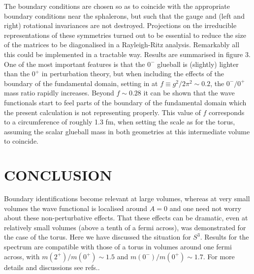 \documentclass[12pt]{book}
\newcommand{\site}[1]{\refnote{\cite{#1}}}
\begin{document}
The boundary conditions are chosen so as to coincide with the appropriate 
boundary conditions near the sphalerons, but such that the gauge and (left 
and right) rotational invariances are not destroyed. Projections on the 
irreducible representations of these symmetries turned out to be essential to 
reduce the size of the matrices to be diagonalised in a Rayleigh-Ritz analysis.
Remarkably all this could be implemented in a tractable way\site{vdhe}. Results
are summarised in figure 3. One of the most important features is that the 
$0^-$ glueball is (slightly) lighter than the $0^+$ in perturbation theory, 
but when including the effects of the boundary of the fundamental domain, 
setting in at $f\equiv g^2/2\pi^2\sim 0.2$, the $0^-/0^+$ mass ratio rapidly 
increases. Beyond 
$f\sim 0.28$ it can be shown that the wave functionals start to feel parts of 
the boundary of the fundamental domain which the present calculation is not 
representing properly\site{vdhe}. This value of $f$ corresponds to a 
circumference of roughly 1.3 fm, when setting the scale as for the torus, 
assuming the scalar glueball mass in both geometries at this intermediate 
volume to coincide. 

\section{CONCLUSION}
Boundary identifications become relevant at large volumes, whereas at very small
volumes the wave functional is localised around $A=0$ and one need not worry 
about these non-perturbative effects. That these effects can be dramatic, even 
at relatively small volumes (above a tenth of a fermi across), was demonstrated
for the case of the torus\site{vba1}. Here we have discussed the situation for
$S^3$. Results for the spectrum are compatible with those of a torus in volumes
around one fermi across\site{mite}, with $m(2^+)/m(0^+)\sim 1.5$ and
$m(0^-)/m(0^+)\sim 1.7$. For more details and discussions see 
refs.\site{vdhe,vba4}. 
\end{document}
